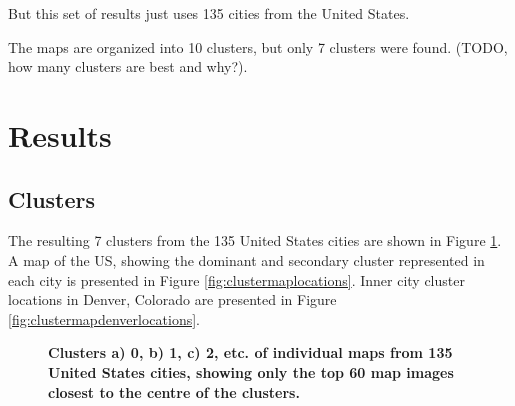 \documentclass[final,3p,times,authoryear]{elsarticle}
\begin{document}
But this set of results just uses 135 cities from the United States.

The maps are organized into 10 clusters, but only 7 clusters were found. (TODO, how many clusters are best and why?). 


\section{Results}\label{results}
\subsection{Clusters}\label{resultsclusters}

The resulting 7 clusters from the 135 United States cities are shown in Figure \ref{fig:clustermapsimages}. A map of the US, showing the dominant and secondary cluster represented in each city is presented in Figure \ref{fig:clustermaplocations}. Inner city cluster locations in Denver, Colorado are presented in Figure \ref{fig:clustermapdenverlocations}.



\begin{figure}[!htbp]
\centering    
\caption{\bf Clusters a) 0, b) 1, c) 2, etc. of individual maps from 135 United States cities, showing only the top 60 map images closest to the centre of the clusters.}    
 \label{fig:clustermapsimages}  
\end{figure} 
\end{document}
